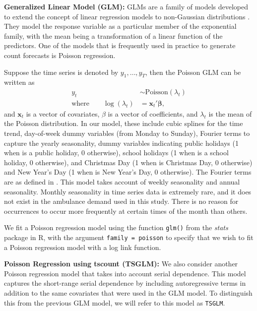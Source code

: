 \documentclass[
  authoryear,
  preprint,
  3p]{elsarticle}
\begin{document}
\textbf{Generalized Linear Model (GLM):} GLMs are a family of models
developed to extend the concept of linear regression models to
non-Gaussian distributions \citep{Faraway2016}. They model the response
variable as a particular member of the exponential family, with the mean
being a transformation of a linear function of the predictors. One of
the models that is frequently used in practice to generate count
forecasts is Poisson regression.

Suppose the time series is denoted by \(y_1,\dots,y_T\), then the
Poisson GLM can be written as \begin{align*}
  y_t &\sim \text{Poisson}(\lambda_t) \\
  \text{where}\qquad
  \log(\lambda_t) &= \bm{x}_t'\bm{\beta},
\end{align*} and \(\bm{x}_t\) is a vector of covariates, \(\beta\) is a
vector of coefficients, and \(\lambda_t\) is the mean of the Poisson
distribution. In our model, these include cubic splines for the time
trend, day-of-week dummy variables (from Monday to Sunday), Fourier
terms to capture the yearly seasonality, dummy variables indicating
public holidays (1 when is a public holiday, 0 otherwise), school
holidays (1 when is a school holiday, 0 otherwise), and Christmas Day (1
when is Christmas Day, 0 otherwise) and New Year's Day (1 when is New
Year's Day, 0 otherwise). The Fourier terms are as defined in
\citet[Section 7.4]{hyndman2021forecasting}. This model takes account of
weekly seasonality and annual seasonality. Monthly seasonality in time
series data is extremely rare, and it does not exist in the ambulance
demand used in this study. There is no reason for occurrences to occur
more frequently at certain times of the month than others.

We fit a Poisson regression model using the function \texttt{glm()} from
the \emph{stats} package in R, with the argument
\texttt{family\ =\ poisson} to specify that we wish to fit a Poisson
regression model with a log link function.

\textbf{Poisson Regression using tscount (TSGLM):} We also consider
another Poisson regression model that takes into account serial
dependence. This model captures the short-range serial dependence by
including autoregressive terms in addition to the same covariates that
were used in the GLM model. To distinguish this from the previous GLM
model, we will refer to this model as \texttt{TSGLM}.
\end{document}
